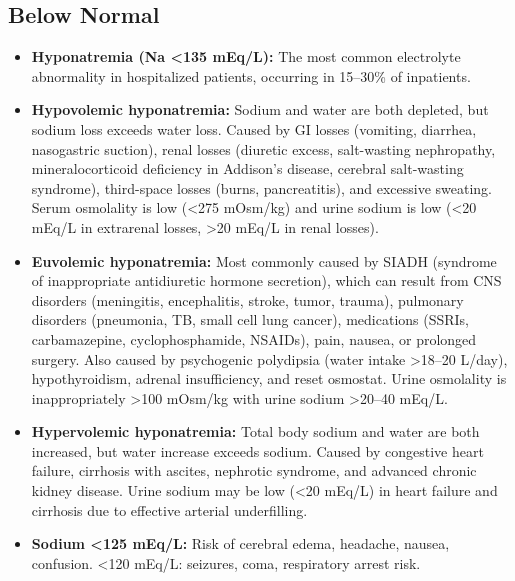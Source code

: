 \subsection*{Below Normal}
\begin{itemize}
  \item \textbf{Hyponatremia (Na <135 mEq/L):} The most common electrolyte abnormality in hospitalized patients, occurring in 15--30\% of inpatients.
  \item \textbf{Hypovolemic hyponatremia:} Sodium and water are both depleted, but sodium loss exceeds water loss. Caused by GI losses (vomiting, diarrhea, nasogastric suction), renal losses (diuretic excess, salt-wasting nephropathy, mineralocorticoid deficiency in Addison's disease, cerebral salt-wasting syndrome), third-space losses (burns, pancreatitis), and excessive sweating. Serum osmolality is low (<275 mOsm/kg) and urine sodium is low (<20 mEq/L in extrarenal losses, >20 mEq/L in renal losses).
  \item \textbf{Euvolemic hyponatremia:} Most commonly caused by SIADH (syndrome of inappropriate antidiuretic hormone secretion), which can result from CNS disorders (meningitis, encephalitis, stroke, tumor, trauma), pulmonary disorders (pneumonia, TB, small cell lung cancer), medications (SSRIs, carbamazepine, cyclophosphamide, NSAIDs), pain, nausea, or prolonged surgery. Also caused by psychogenic polydipsia (water intake >18--20 L/day), hypothyroidism, adrenal insufficiency, and reset osmostat. Urine osmolality is inappropriately >100 mOsm/kg with urine sodium >20--40 mEq/L.
  \item \textbf{Hypervolemic hyponatremia:} Total body sodium and water are both increased, but water increase exceeds sodium. Caused by congestive heart failure, cirrhosis with ascites, nephrotic syndrome, and advanced chronic kidney disease. Urine sodium may be low (<20 mEq/L) in heart failure and cirrhosis due to effective arterial underfilling.
  \item \textbf{Sodium <125 mEq/L:} Risk of cerebral edema, headache, nausea, confusion. <120 mEq/L: seizures, coma, respiratory arrest risk.
\end{itemize}

